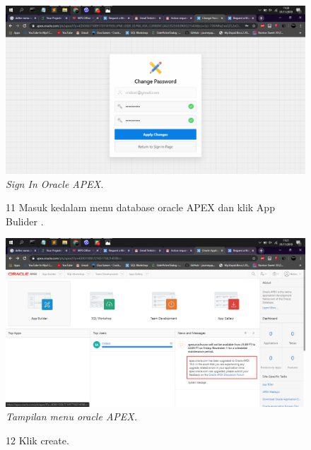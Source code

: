 \begin{enumerate}
\begin{figure}
    \begin{center}
\includegraphics[scale=0.2]{figures/9.png}
    \caption{\textit{Sign In Oracle APEX.}}
        \end{center}
\label{gambar}
\end{figure}

\begin{figure}
\item[11] Masuk kedalam menu database oracle APEX dan klik App Bulider .

    \begin{center}
\includegraphics[scale=0.2]{figures/10.png}
    \caption{\textit{Tampilan menu oracle APEX.}}
        \end{center}
\label{gambar}
\end{figure}

\begin{figure}
\item[12] Klik create.


\end{figure}
\end{enumerate}
